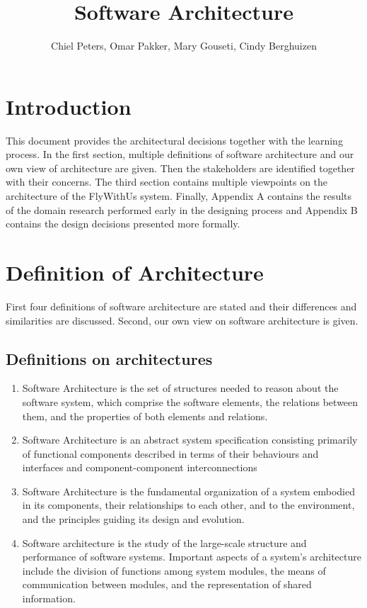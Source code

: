 \documentclass{article}
\begin{document}
\title{Software Architecture}
\author{Chiel Peters, Omar Pakker, Mary Gouseti, Cindy Berghuizen}
\maketitle
\setlength\parindent{0pt}

\section{Introduction}
This document provides the architectural decisions together with the learning process. In the first section, multiple definitions of software architecture and our own view of architecture are given. Then the stakeholders are identified together with their concerns.
The third section contains multiple viewpoints on the architecture of the FlyWithUs system. Finally, Appendix A contains the results of the domain research performed early in the designing process and Appendix B contains the design decisions presented more formally.

\section{Definition of Architecture}

First four definitions of software architecture are stated and their differences
and similarities are discussed. Second, our own view on software architecture is
given.
\subsection{Definitions on architectures}

\begin{enumerate}
\item Software Architecture is the set of structures needed to reason about the software system, which comprise the software elements, the relations between them, and the properties of both elements and relations.\cite{clemens}

\item Software Architecture is an abstract system specification consisting primarily of functional components described in terms of their behaviours and interfaces and component-component interconnections\cite{hayesroth}

\item Software Architecture is the fundamental organization of a system embodied in its components, their relationships to each other, and to the environment, and the principles guiding its design and evolution.\cite{IEEE1471}

\item Software architecture is the study of the large-scale structure and performance of software systems. Important aspects of a system's architecture include the division of functions among system modules, the means of communication between modules, and the representation of shared information.\cite{lane90}

\end{enumerate}
\end{document}
